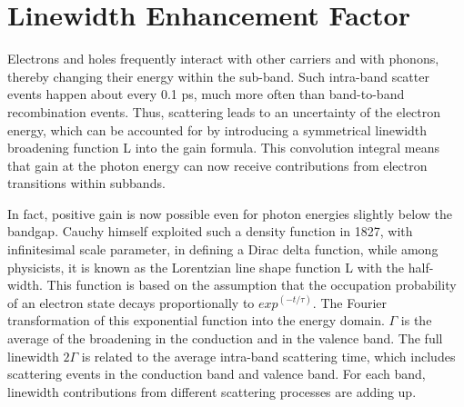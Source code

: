 \section{Linewidth Enhancement Factor} \label{Linewidth}

Electrons and holes frequently interact with other carriers and with phonons,
thereby changing their energy within the sub-band. Such intra-band scatter
events happen about every 0.1 ps, much more often than band-to-band
recombination events. Thus, scattering leads to an uncertainty of the electron
energy, which can be accounted for by introducing a symmetrical linewidth
broadening function L into the gain formula. This convolution integral means
that gain at the photon energy can now receive contributions from electron
transitions within subbands.

In fact, positive gain is now possible even for photon energies slightly below
the bandgap. Cauchy himself exploited such a density function in 1827, with
infinitesimal scale parameter, in defining a Dirac delta function, while among
physicists, it is known as the Lorentzian line shape function L with the
half-width. This function is based on the assumption that the occupation
probability of an electron state decays proportionally to
${exp}^{(-{t}/{\tau})}$.  The Fourier transformation of this exponential
function into the energy domain.  $\Gamma$ is the average of the broadening in
the conduction and in the valence band. The full linewidth $2\Gamma$ is related
to the average intra-band scattering time, which includes scattering events in
the conduction band and valence band. For each band, linewidth contributions
from different scattering processes are adding up.
